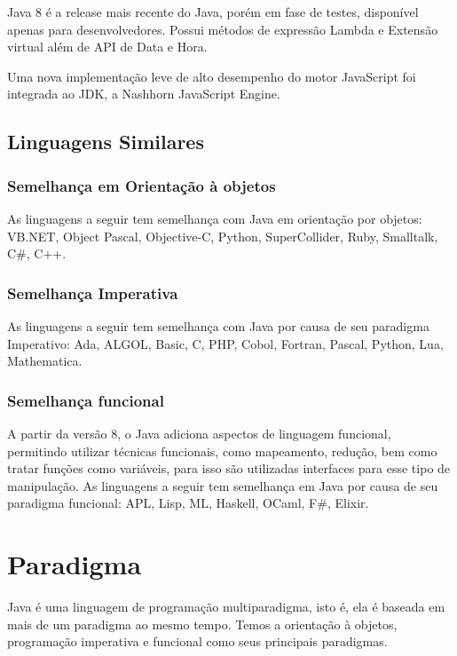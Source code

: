 \documentclass[
	12pt,				%
	openright,			%
	oneside,			%
	a4paper,			%
	english,			%
	french,				%
	spanish,			%
	brazil				%
	]{abntex2}
\begin{document}
Java 8 é a release mais recente do Java, porém em fase de testes, disponível apenas para desenvolvedores.
Possui métodos de expressão Lambda e Extensão virtual além de API de Data e Hora.

Uma nova implementação leve de alto desempenho do motor JavaScript foi integrada ao JDK, a Nashhorn JavaScript Engine.


\section{Linguagens Similares}

\subsection{Semelhança em Orientação à objetos}

As linguagens a seguir tem semelhança com Java em orientação por objetos: VB.NET, Object Pascal, Objective-C, Python, SuperCollider, Ruby, Smalltalk, C\#, C++.

\subsection{Semelhança Imperativa}

As linguagens a seguir tem semelhança com Java por causa de seu paradigma Imperativo: Ada, ALGOL, Basic, C, PHP, Cobol, Fortran, Pascal, Python, Lua, Mathematica.

\subsection{Semelhança funcional}

A partir da versão 8, o Java adiciona aspectos de linguagem funcional, permitindo utilizar técnicas funcionais, como mapeamento, redução, bem como tratar funções como variáveis, para isso são utilizadas interfaces para esse tipo de manipulação.
As linguagens a seguir tem semelhança em Java por causa de seu paradigma funcional: APL, Lisp, ML, Haskell, OCaml, F\#, Elixir.



{\let\clearpage\relax \chapter[Paradigma]{Paradigma}}

Java é uma linguagem de programação multiparadigma, isto é, ela é baseada em mais de um paradigma ao mesmo tempo. Temos a orientação à objetos, programação imperativa e funcional como seus principais paradigmas.
\end{document}
